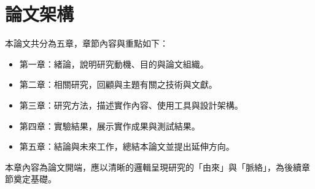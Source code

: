 
\section{論文架構}

本論文共分為五章，章節內容與重點如下：

\begin{itemize}
  \item 第一章：緒論，說明研究動機、目的與論文組織。
  \item 第二章：相關研究，回顧與主題有關之技術與文獻。
  \item 第三章：研究方法，描述實作內容、使用工具與設計架構。
  \item 第四章：實驗結果，展示實作成果與測試結果。
  \item 第五章：結論與未來工作，總結本論文並提出延伸方向。
\end{itemize}

本章內容為論文開端，應以清晰的邏輯呈現研究的「由來」與「脈絡」，為後續章節奠定基礎。
